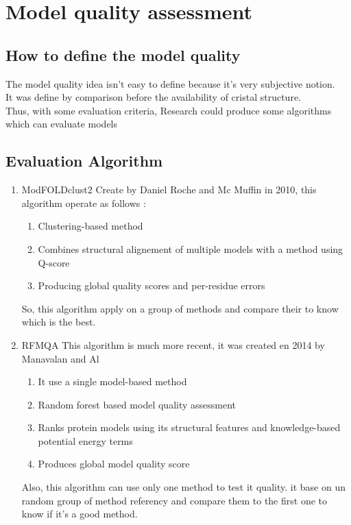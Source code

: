 \section{Model quality assessment}
\subsection{How to define the model quality}
   The model quality idea isn't easy to define because it's very subjective notion.\\
   It was define by comparison before the availability of cristal structure.\\

   Thus, with some evaluation criteria, Research could produce some algorithms which can evaluate models

\subsection{Evaluation Algorithm}
   \begin{enumerate}
	\item ModFOLDclust2
          Create by Daniel Roche and Mc Muffin in 2010, this algorithm operate as follows :
	  \begin{enumerate}
             \item Clustering-based method
             \item Combines structural alignement of multiple models with a method using Q-score
             \item Producing global quality scores and per-residue errors
	  \end{enumerate}
          So, this algorithm apply on a group of methods and compare their to know which is the best.
	\item RFMQA 
          This algorithm is much more recent, it was created en 2014 by Manavalan and Al
	  \begin{enumerate}
             \item It use a single model-based method
             \item Random forest based model quality assessment
             \item Ranks protein models using its structural features and knowledge-based potential energy terms
             \item Produces global model quality score
	  \end{enumerate}
          Also, this algorithm can use only one method to test it quality. it base on un random group of method referency and compare them to the first one to know if it's a good method.
          
   \end{enumerate}



